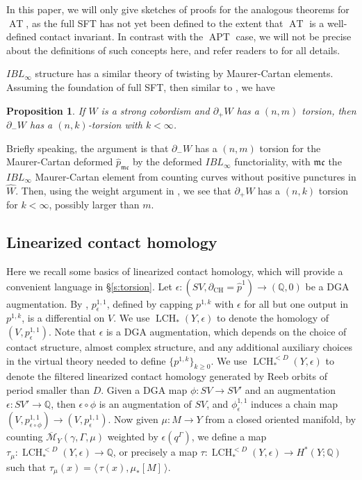 \documentclass[11pt]{amsart}
\numberwithin{equation}{section}
\newtheorem{proposition}[theorem]{\textbf{Proposition}}
\def\Q{{\mathbb Q}}
\def\cM{{\mathcal M}}
\def\mc{{\mathfrak {mc}}}
\def\la{\langle\,}
\def\ra{\,\rangle}
\DeclareMathOperator{\APT}{APT}
\DeclareMathOperator{\AT}{AT}
\DeclareMathOperator{\CH}{CH}
\DeclareMathOperator{\LCH}{LCH}
\begin{document}
In this paper, we will only give sketches of proofs for the analogous theorems for $\AT$,  as the full SFT has not yet been defined to the extent that $\AT$ is a well-defined contact invariant. In contrast with the $\APT$ case, we will not be precise about the definitions of such concepts here, and refer readers to \cite{LW,moreno2024rsft} for all details.

$IBL_\infty$ structure has a similar theory of twisting by Maurer-Cartan elements. Assuming the foundation of full SFT, then similar to \cite[Theorem 1.1]{moreno2024rsft}, we have
\begin{proposition}\label{prop:IBL_torsion}
If $W$ is a strong cobordism and $\partial_+W$ has a $(n,m)$ torsion, then $\partial_-W$ has a $(n,k)$-torsion with $k<\infty$. 
\end{proposition}
Briefly speaking, the argument is that $\partial_-W$ has a $(n,m)$ torsion for the Maurer-Cartan deformed $\widehat{p}_{\mc}$ by the deformed $IBL_\infty$ functoriality, with $\mc$ the $IBL_\infty$ Maurer-Cartan element from counting curves without positive punctures in $\widehat{W}$. Then, using the weight argument in \cite[Theorem 1.1]{moreno2024rsft}, we see that $\partial_+W$ has a $(n,k)$ torsion for $k<\infty$, possibly larger than $m$. 

\subsection{Linearized contact homology}
Here we recall some basics of linearized contact homology, which will provide a convenient language in \S \ref{s:torsion}. Let $\epsilon:(SV,\partial_{\CH}=\widehat{p}^1) \to (\Q,0)$ be a DGA augmentation. By \cite[Proposition 2.18]{moreno2024landscape}, $p^{1,1}_{\epsilon}$, defined by capping $p^{1,k}$ with $\epsilon$ for all but one output in $p^{1,k}$, is a differential on $V$. We use $\LCH_*(Y,\epsilon)$ to denote the homology of $(V,p^{1,1}_{\epsilon})$. Note that $\epsilon$ is a DGA augmentation, which depends on the choice of contact structure, almost complex structure, and any additional auxiliary choices in the virtual theory needed to define $\{p^{1,k}\}_{k\ge 0}$. We use $\LCH^{<D}_*(Y,\epsilon)$ to denote the filtered linearized contact homology generated by Reeb orbits of period smaller than $D$. Given a DGA map $\phi:SV\to SV'$ and an augmentation $\epsilon:SV'\to \Q$, then $\epsilon\circ \phi$ is an augmentation of $SV$, and $\phi^{1,1}_{\epsilon}$ induces a chain map $(V,p^{1,1}_{\epsilon\circ \phi})\to (V,p^{1,1}_{\epsilon})$. Now given $\mu:M\to Y$ from a closed oriented manifold, by counting $\overline{\cM}_Y(\gamma,\Gamma,\mu)$ weighted by $\epsilon(q^{\Gamma})$, we define a map $\tau_{\mu}:\LCH^{<D}_*(Y,\epsilon)\to \Q$, or precisely a map $\tau:\LCH^{<D}_*(Y,\epsilon)\to H^*(Y;\Q)$ such that $\tau_{\mu}(x)=\la \tau(x),\mu_*[M] \ra$. 
\end{document}
